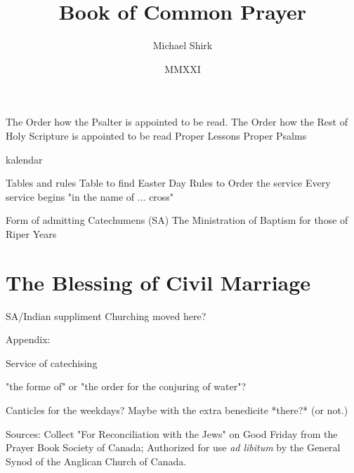 \documentclass[foolscapvopaper,10pt,twoside,openany,extrafontsizes,final]{memoir}
\begin{document}
\frontmatter
\title{Book of Common Prayer}
\author{Michael Shirk}
\date{MMXXI}




\tableofcontents*


The Order how the Psalter is appointed to be read.
The Order how the Rest of Holy Scripture is appointed to be read
Proper Lessons
Proper Psalms


kalendar

Tables and rules
Table to find Easter Day
Rules to Order the service
  Every service begins "in the name of ... cross"

\mainmatter















Form of admitting Catechumens (SA)
The Ministration of Baptism for those of Riper Years




\chapter{The Blessing of Civil Marriage}
SA/Indian suppliment
Churching moved here?




% 




Appendix:

Service of catechising

"the forme of" or "the order for the conjuring of water"?


Canticles for the weekdays? Maybe with the extra benedicite *there?* (or not.)

Sources:
Collect "For Reconciliation with the Jews" on Good Friday from the Prayer Book Society of Canada; Authorized for use \emph{ad libitum} by the General Synod of the Anglican Church of Canada.
\end{document}
